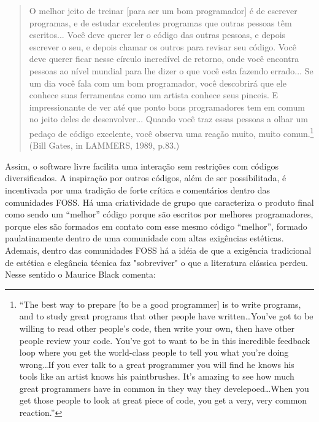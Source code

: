 \begin{quote}
O melhor jeito de treinar [para ser um bom programador] é de escrever programas, e de estudar excelentes programas que outras pessoas têm escritos... Você deve querer ler o código das outras pessoas, e depois escrever o seu, e depois chamar os outros para revisar seu código. Você deve querer ficar nesse círculo incredível de retorno, onde você encontra pessoas ao nível mundial para lhe dizer o que você esta fazendo errado... Se um dia você fala com um bom programador, você descobrirá que ele conhece suas ferramentas como um artista conhece seus pinceis. E impressionante de ver até que ponto bons programadores tem em comum no jeito deles de desenvolver... Quando você traz essas pessoas a olhar um pedaço de código excelente, você observa uma reação muito, muito comun.\footnote{“The best way to prepare [to be a good programmer] is to write programs, and to study great programs that other people have written\ldots You've got to be willing to read other people's code, then write your own, then have other people review your code.  You've got to want to be in this incredible feedback loop where you get the world-class people to tell you what you're doing wrong\ldots If you ever talk to a great programmer you will find he knows his tools like an artist knows his paintbrushes. It's amazing to see how much great programmers have in common in they way they develepoed\ldots When you get those people to look at great piece of code, you get a very, very common reaction.”} (Bill Gates, in LAMMERS, 1989, p.83.)
\begin{flushright}
\end{flushright}
\end{quote}

Assim, o software livre facilita uma interação sem restrições com códigos diversificados. A inspiração por outros códigos, além de ser possibilitada, é incentivada por uma tradição de forte crítica e comentários dentro das comunidades FOSS. Há uma criatividade de grupo que caracteriza o produto final como sendo um “melhor” código porque são escritos por melhores programadores, porque eles são formados em contato com esse mesmo código “melhor”, formado paulatinamente dentro de uma comunidade com altas exigências estéticas. Ademais, dentro das comunidades FOSS há a idéia de que a exigência tradicional de estética e elegância técnica faz "sobreviver" o que a literatura clássica perdeu. Nesse sentido o Maurice Black comenta:


